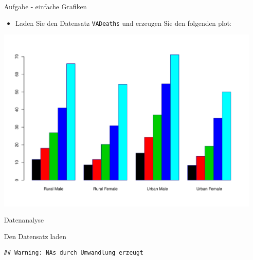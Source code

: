 \documentclass[ignorenonframetext,]{beamer}
\newenvironment{Shaded}{}{}
\newcommand{\KeywordTok}[1]{\textcolor[rgb]{0.00,0.44,0.13}{\textbf{{#1}}}}
\newcommand{\StringTok}[1]{\textcolor[rgb]{0.25,0.44,0.63}{{#1}}}
\newcommand{\NormalTok}[1]{{#1}}
\providecommand{\tightlist}{%
\setlength{\itemsep}{0pt}\setlength{\parskip}{0pt}}
\begin{document}
\begin{frame}[fragile]{Aufgabe - einfache Grafiken}

\begin{itemize}
\tightlist
\item
  Laden Sie den Datensatz \texttt{VADeaths} und erzeugen Sie den
  folgenden plot:
\end{itemize}

\includegraphics{R_intern_files/figure-beamer/unnamed-chunk-172-1.pdf}

\end{frame}

\begin{frame}{Datenanalyse}

\end{frame}

\begin{frame}[fragile]{Den Datensatz laden}

\begin{verbatim}
## Warning: NAs durch Umwandlung erzeugt
\end{verbatim}

\begin{Shaded}
\end{Shaded}

\end{frame}
\end{document}
